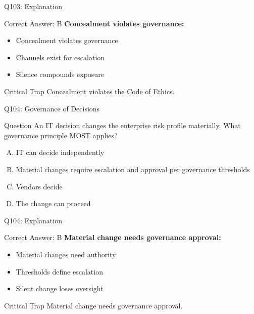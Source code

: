 \documentclass{beamer}
\begin{document}
	\begin{frame}{Q103: Explanation}
		\begin{block}{Correct Answer: B}
			\textbf{Concealment violates governance:}
			\begin{itemize}
				\item Concealment violates governance
				\item Channels exist for escalation
				\item Silence compounds exposure
			\end{itemize}
		\end{block}
		\begin{alertblock}{Critical Trap}
			Concealment violates the Code of Ethics.
		\end{alertblock}
	\end{frame}
	
	\begin{frame}{Q104: Governance of Decisions}
		\begin{block}{Question}
			An IT decision changes the enterprise risk profile materially. What governance principle MOST applies?
		\end{block}
		\begin{enumerate}[(A)]
			\item IT can decide independently
			\item Material changes require escalation and approval per governance thresholds
			\item Vendors decide
			\item The change can proceed
		\end{enumerate}
	\end{frame}
	
	\begin{frame}{Q104: Explanation}
		\begin{block}{Correct Answer: B}
			\textbf{Material change needs governance approval:}
			\begin{itemize}
				\item Material changes need authority
				\item Thresholds define escalation
				\item Silent change loses oversight
			\end{itemize}
		\end{block}
		\begin{alertblock}{Critical Trap}
			Material change needs governance approval.
		\end{alertblock}
	\end{frame}
	
\end{document}
